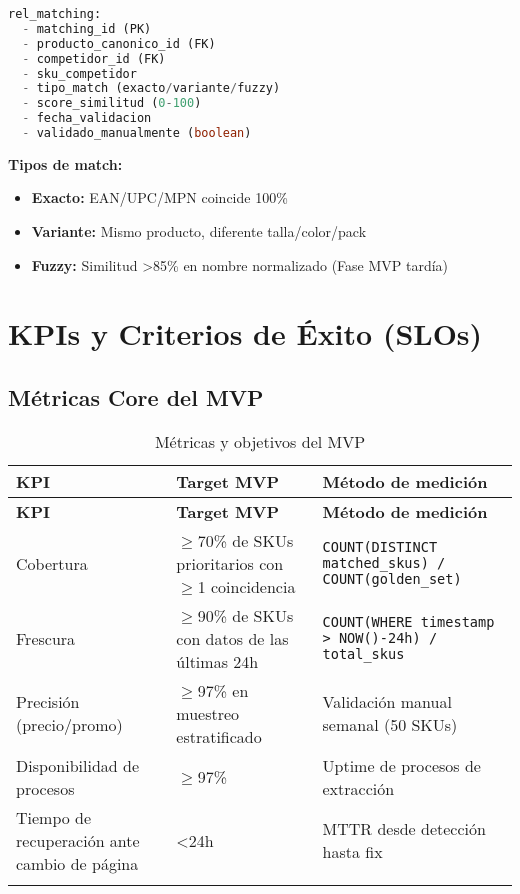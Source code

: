 \documentclass[12pt,a4paper]{article}
\begin{document}
\begin{lstlisting}[language=SQL, basicstyle=\small\ttfamily, frame=single]
rel_matching:
  - matching_id (PK)
  - producto_canonico_id (FK)
  - competidor_id (FK)
  - sku_competidor
  - tipo_match (exacto/variante/fuzzy)
  - score_similitud (0-100)
  - fecha_validacion
  - validado_manualmente (boolean)
\end{lstlisting}

\textbf{Tipos de match:}
\begin{itemize}[leftmargin=*]
    \item \textbf{Exacto:} EAN/UPC/MPN coincide 100\%
    \item \textbf{Variante:} Mismo producto, diferente talla/color/pack
    \item \textbf{Fuzzy:} Similitud >85\% en nombre normalizado (Fase MVP tardía)
\end{itemize}

\section{KPIs y Criterios de Éxito (SLOs)}

\subsection{Métricas Core del MVP}

\begin{longtable}{|p{3cm}|p{3cm}|p{7cm}|}
\hline
\textbf{KPI} & \textbf{Target MVP} & \textbf{Método de medición} \\
\hline
\endfirsthead
\hline
\textbf{KPI} & \textbf{Target MVP} & \textbf{Método de medición} \\
\hline
\endhead
Cobertura & $\geq$70\% de SKUs prioritarios con $\geq$1 coincidencia & \texttt{COUNT(DISTINCT matched\_skus) / COUNT(golden\_set)} \\
\hline
Frescura & $\geq$90\% de SKUs con datos de las últimas 24h & \texttt{COUNT(WHERE timestamp > NOW()-24h) / total\_skus} \\
\hline
Precisión (precio/promo) & $\geq$97\% en muestreo estratificado & Validación manual semanal (50 SKUs) \\
\hline
Disponibilidad de procesos & $\geq$97\% & Uptime de procesos de extracción \\
\hline
Tiempo de recuperación ante cambio de página & <24h & MTTR desde detección hasta fix \\
\hline
\caption{Métricas y objetivos del MVP}
\end{longtable}
\end{document}
